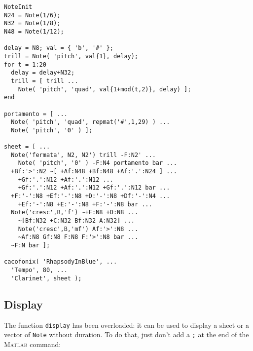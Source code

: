 \documentclass{article}
\newcommand{\matlab}{\textsc{Matlab}\xspace}
\newcommand{\note}{\lstinline!Note!\xspace}
\begin{document}
\begin{lstlisting}
NoteInit
N24 = Note(1/6);
N32 = Note(1/8);
N48 = Note(1/12);

delay = N8; val = { 'b', '#' };
trill = Note( 'pitch', val{1}, delay);
for t = 1:20
  delay = delay+N32;
  trill = [ trill ...
    Note( 'pitch', 'quad', val{1+mod(t,2)}, delay) ];
end

portamento = [ ...
  Note( 'pitch', 'quad', repmat('#',1,29) ) ...
  Note( 'pitch', '0' ) ];

sheet = [ ...
  Note('fermata', N2, N2') trill -F:N2' ...
    Note( 'pitch', '0' ) -F:N4 portamento bar ...
  +Bf:'>':N2 ~[ +Af:N48 +Bf:N48 +Af:'.':N24 ] ...
    +Gf:'.':N12 +Af:'.':N12 ...
    +Gf:'.':N12 +Af:'.':N12 +Gf:'.':N12 bar ...
  +F:'-':N8 +Ef:'-':N8 +D:'-':N8 +Df:'-':N4 ...
    +Ef:'-':N8 +E:'-':N8 +F:'-':N8 bar ...
  Note('cresc',B,'f') ~+F:N8 +D:N8 ...
    ~[Bf:N32 +C:N32 Bf:N32 A:N32] ...
    Note('cresc',B,'mf') Af:'>':N8 ...
    ~Af:N8 Gf:N8 F:N8 F:'>':N8 bar ...
  ~F:N bar ];

cacofonix( 'RhapsodyInBlue', ...
  'Tempo', 80, ...
  'Clarinet', sheet );
\end{lstlisting}

\subsection{Display}
\label{sec:Display}

The function \lstinline!display! has been overloaded: it can be used to display a sheet or a vector of \note without duration. To do that, just don't add a \lstinline!;! at the end of the \matlab command: \\
\end{document}
